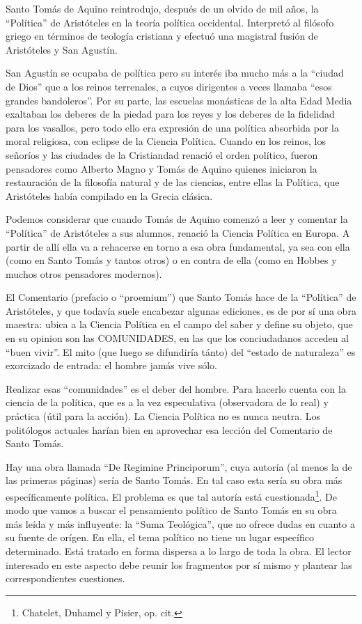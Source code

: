 \documentclass[
]{book}
\begin{document}
Santo Tomás de Aquino reintrodujo, después de un olvido de mil años, la ``Política'' de Aristóteles en la teoría política occidental. Interpretó al filósofo griego en términos de teología cristiana y efectuó una magistral fusión de Aristóteles y San Agustín.

San Agustín se ocupaba de política pero su interés iba mucho más a la ``ciudad de Dios'' que a los reinos terrenales, a cuyos dirigentes a veces llamaba ``esos grandes bandoleros''. Por su parte, las escuelas monásticas de la alta Edad Media exaltaban los deberes de la piedad para los reyes y los deberes de la fidelidad para los vasallos, pero todo ello era expresión de una política absorbida por la moral religiosa, con eclipse de la Ciencia Política. Cuando en los reinos, los señoríos y las ciudades de la Cristiandad renació el orden político, fueron pensadores como Alberto Magno y Tomás de Aquino quienes iniciaron la restauración de la filosofía natural y de las ciencias, entre ellas la Política, que Aristóteles había compilado en la Grecia clásica.

Podemos considerar que cuando Tomás de Aquino comenzó a leer y comentar la ``Política'' de Aristóteles a sus alumnos, renació la Ciencia Política en Europa. A partir de allí ella va a rehacerse en torno a esa obra fundamental, ya sea con ella (como en Santo Tomás y tantos otros) o en contra de ella (como en Hobbes y muchos otros pensadores modernos).

El Comentario (prefacio o ``proemium'') que Santo Tomás hace de la ``Política'' de Aristóteles, y que todavía suele encabezar algunas ediciones, es de por sí una obra maestra: ubica a la Ciencia Política en el campo del saber y define su objeto, que en su opinion son las COMUNIDADES, en las que los conciudadanos acceden al ``buen vivir''. El mito (que luego se difundiría tánto) del ``estado de naturaleza'' es exorcizado de entrada: el hombre jamás vive sólo.

Realizar esas ``comunidades'' es el deber del hombre. Para hacerlo cuenta con la ciencia de la política, que es a la vez especulativa (observadora de lo real) y práctica (útil para la acción). La Ciencia Política no es nunca neutra. Los politólogos actuales harían bien en aprovechar esa lección del Comentario de Santo Tomás.

Hay una obra llamada ``De Regimine Principorum'', cuya autoría (al menos la de las primeras páginas) sería de Santo Tomás. En tal caso esta sería su obra más específicamente política. El problema es que tal autoría está cuestionada\footnote{Chatelet, Duhamel y Pisier, op. cit.}. De modo que vamos a buscar el pensamiento político de Santo Tomás en su obra más leída y más influyente: la ``Suma Teológica'', que no ofrece dudas en cuanto a su fuente de orígen. En ella, el tema político no tiene un lugar específico determinado. Está tratado en forma dispersa a lo largo de toda la obra. El lector interesado en este aspecto debe reunir los fragmentos por sí mismo y plantear las correspondientes cuestiones.
\end{document}
